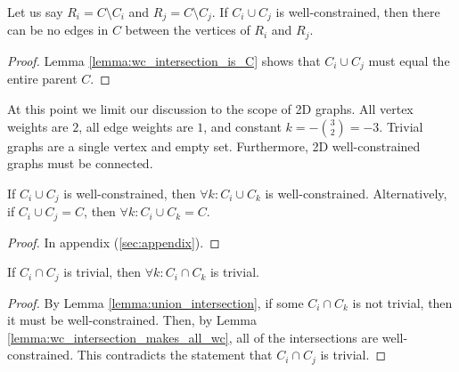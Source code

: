\begin{corollary}\label{corollary:no_edges_between_diff}
Let us say $R_i=C\setminus C_i$ and $R_j=C\setminus C_j$. If $C_i\cup C_j$ is well-constrained, then there can be no edges in $C$ between the vertices of $R_i$ and $R_j$.
\end{corollary}

\begin{proof}
Lemma \ref{lemma:wc_intersection_is_C} shows that $C_i\cup C_j$ must equal the entire parent $C$.
\end{proof}



At this point we limit our discussion to the scope of 2D graphs. All vertex weights are $2$, all edge weights are $1$, and constant $k= -{{3}\choose{2}}=-3$. Trivial graphs are a single vertex and empty set. Furthermore, 2D well-constrained graphs must be connected.

\begin{lemma}\label{lemma:wc_intersection_makes_all_wc}
If $C_i\cup C_j$ is well-constrained, then $\forall k: C_i\cup C_k$ is well-constrained.
Alternatively, if $C_i\cup C_j=C$, then $\forall k: C_i\cup C_k=C$.
\end{lemma}

\begin{proof}
In appendix (\ref{sec:appendix}).
\end{proof}



\begin{lemma}\label{lemma:uc_intersection_makes_all_uc}
If $C_i\cap C_j$ is trivial, then $\forall k: C_i\cap C_k$ is trivial.
\end{lemma}

\begin{proof}
By Lemma \ref{lemma:union_intersection}, if some $C_i\cap C_k$ is not trivial, then it must be well-constrained. Then, by Lemma \ref{lemma:wc_intersection_makes_all_wc}, all of the intersections are well-constrained. This contradicts the statement that $C_i\cap C_j$ is trivial.
\end{proof}





